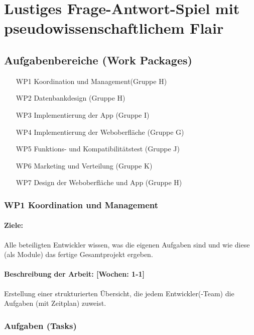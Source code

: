 \documentclass{scrreprt}
\begin{document}
\chapter{Lustiges Frage-Antwort-Spiel mit pseudowissenschaftlichem Flair}


\section*{Aufgabenbereiche (Work Packages)}

\begin{enumerate}
\item [WP1] Koordination und Management(Gruppe H)
\item [WP2] Datenbankdesign (Gruppe H)
\item [WP3] Implementierung der App (Gruppe I)
\item [WP4] Implementierung der Weboberfläche (Gruppe G)
\item [WP5] Funktions- und Kompatibilitätstest (Gruppe J)
\item [WP6] Marketing und Verteilung (Gruppe K)
\item [WP7] Design der Weboberfläche und App (Gruppe H)
\end{enumerate}


\subsection*{WP1 Koordination und Management}

\subsubsection{Ziele:} Alle beteiligten Entwickler wissen, was die eigenen Aufgaben sind und wie diese (als Module) das fertige Gesamtprojekt ergeben.
\subsubsection{Beschreibung der Arbeit: [Wochen: 1-1]} Erstellung einer strukturierten Übersicht, die jedem Entwickler(-Team) die Aufgaben (mit Zeitplan) zuweist.

\subsection*{Aufgaben (Tasks)}
\end{document}
